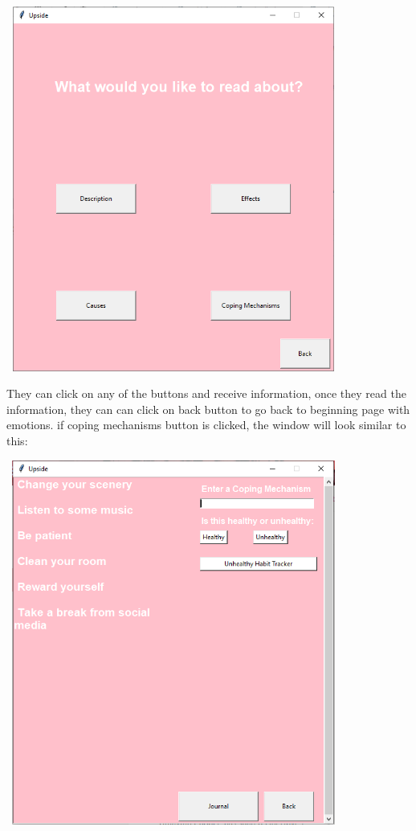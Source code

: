 \documentclass{article}
\begin{document}
    \begin{center}
        \includegraphics[width=11cm,height=12cm]{Images/options.png}
    \end{center}

    They can click on any of the buttons and receive information, once they read the information, they can can click on back button to go back to beginning page with emotions. if coping mechanisms button is clicked, the window will look similar to this:  \\

    \begin{center}
        \includegraphics[width=11cm,height=12cm]{Images/copingmechanims.png}
    \end{center}
\end{document}
